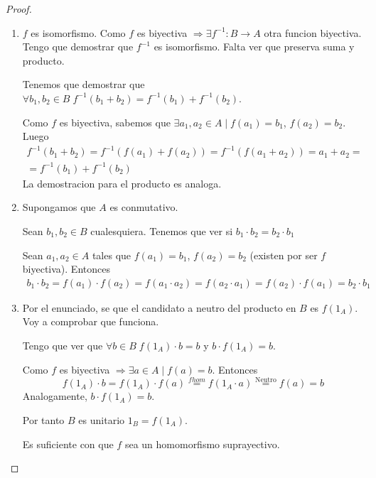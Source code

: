 \begin{proof}
	\begin{enumerate}
		\item \(f \) es isomorfismo. Como \(f \) es biyectiva \(\Rightarrow \exists f^{-1} \colon B \to A \) otra funcion biyectiva. Tengo que demostrar que \(f^{-1} \) es isomorfismo. Falta ver que preserva suma y producto.
		      
		      Tenemos que demostrar que \(\forall b_1,b_2 \in B \; f^{-1} (b_1 + b_2) = f^{-1} (b_1) + f^{-1} (b_2)\).
		      
		      Como \(f \) es biyectiva, sabemos que \(\exists a_1,a_{2} \in A \mid f(a_1) = b_1\), \(f(a_2) = b_2 \). Luego
		      \begin{multline*}
			      f^{-1} (b_1 + b_2) = f^{-1} (f(a_1) + f(a_2)) = f^{-1} (f(a_1 + a_2)) = a_1 + a_2 = \\ = f^{-1} (b_1) + f^{-1} (b_2 )
		      \end{multline*}
		      La demostracion para el producto es analoga.
		\item Supongamos que \(A \) es conmutativo.
		      
		      Sean \(b_1,b_2 \in B \) cualesquiera. Tenemos que ver si \(b_1 \cdot b_2 = b_2 \cdot b_1 \)
		      
		      Sean \(a_1,a_2 \in A \) tales que \(f(a_1) = b_1 \), \(f(a_2) = b_2 \) (existen por ser \(f \) biyectiva). Entonces
		      \begin{multline*}
			      b_1 \cdot b_2 = f(a_1) \cdot f(a_2) = f (a_1 \cdot a_2) = f(a_2 \cdot a_1) = f(a_2) \cdot f(a_1) = b_2 \cdot b_1
		      \end{multline*}
		\item Por el enunciado, se que el candidato a neutro del producto en \(B \) es \(f(1_A )\). Voy a comprobar que funciona.
		      
		      Tengo que ver que \(\forall b \in B \; f(1_A) \cdot b =  b\) y \(b \cdot f(1_A) = b \).
		      
		      Como \(f \) es biyectiva \(\Rightarrow \exists a \in A \mid f(a) = b \). Entonces
		      \[
			      f(1_A) \cdot b = f(1_A) \cdot f(a) \overset{f hom}{=} f(1_A \cdot a) \overset{\text{Neutro}}{=} f(a) = b
		      \]
		      Analogamente, \(b \cdot f(1_A) = b \).
		      
		      Por tanto \(B \) es unitario \(1_B = f(1_A )\).
		      \begin{remark}
			      Es suficiente con que \(f \) sea un homomorfismo suprayectivo.
		      \end{remark}
		      

\end{enumerate}
\end{proof}
